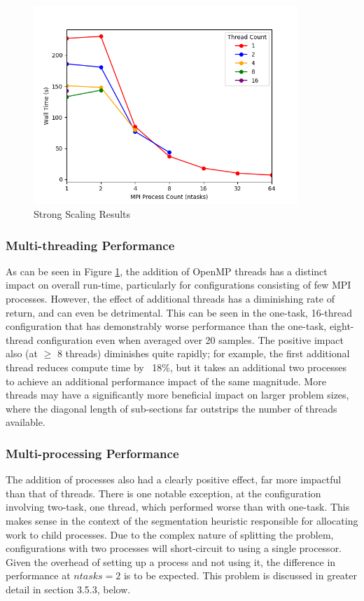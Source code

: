 \begin{figure}[H]
\centering
\includegraphics[width=10cm]{img/strong.png}
\caption{Strong Scaling Results}
\label{fig:strong-results}
\end{figure}

\subsubsection{Multi-threading Performance}
As can be seen in Figure \ref{fig:strong-results}, the addition of OpenMP threads has a distinct impact on overall run-time, particularly for configurations consisting of few MPI processes. However, the effect of additional threads has a diminishing rate of return, and can even be detrimental. This can be seen in the one-task, 16-thread configuration that has demonstrably worse performance than the one-task, eight-thread configuration even when averaged over 20 samples. The positive impact also (at $\geq$ 8 threads) diminishes quite rapidly; for example, the first additional thread reduces compute time by ~18\%, but it takes an additional two processes to achieve an additional performance impact of the same magnitude. More threads may have a significantly more beneficial impact on larger problem sizes, where the diagonal length of sub-sections far outstrips the number of threads available.

\subsubsection{Multi-processing Performance}
The addition of processes also had a clearly positive effect, far more impactful than that of threads. There is one notable exception, at the configuration involving two-task, one thread, which performed worse than with one-task. This makes sense in the context of the segmentation heuristic responsible for allocating work to child processes. Due to the complex nature of splitting the problem, configurations with two processes will short-circuit to using a single processor. Given the overhead of setting up a process and not using it, the difference in performance at $ntasks=2$ is to be expected. This problem is discussed in greater detail in section 3.5.3, below.

